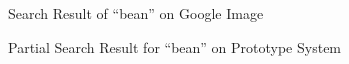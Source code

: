 \begin{figure}[th]
\centering
{}
\caption{Search Result of ``bean'' on Google Image}
\label{fig:search-bean-on-google}
\end{figure}
%
\begin{figure}[th]
\centering
{}
\caption{Partial Search Result for ``bean'' on Prototype System}
\label{fig:demo-bean}
\end{figure}



